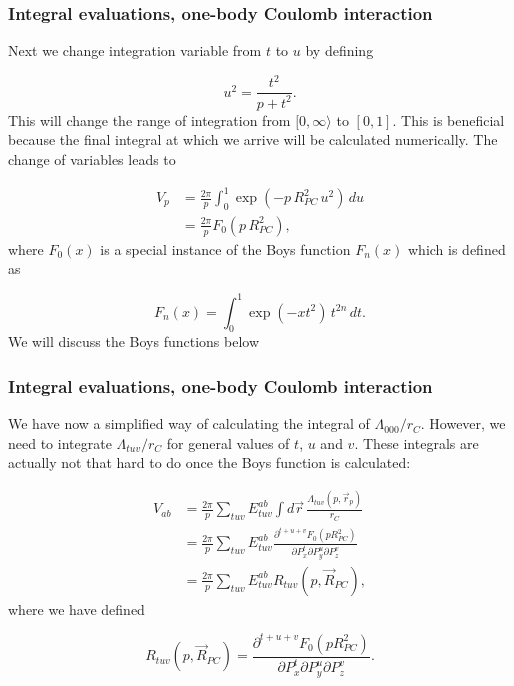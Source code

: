 \documentclass{beamer}
\begin{document}
\begin{frame}
\frametitle{Integral evaluations, one-body Coulomb interaction}

\begin{block}{}

Next we change integration variable from $t$ to $u$ by defining

\begin{equation}
 u^2 = \frac{t^2}{p + t^2}.
\end{equation}
This will change the range of integration from $[0,\infty\rangle$ to $[0,1]$. This is beneficial because the final integral at which we arrive will be calculated numerically.
The change of variables leads to

\begin{align}
\label{eq:V_p}
 V_p & = \frac{2\pi}{p}\int_0^1\exp(-p\,R^2_{PC}\,u^2)\,du \\
     & = \frac{2\pi}{p}F_0(p\,R^2_{PC}),
\end{align}
where $F_0(x)$ is a special instance of the Boys function $F_n(x)$ which is defined as

\begin{equation}
 F_n(x) = \int_0^1\exp(-xt^2)\,t^{2n}\,dt.
\end{equation}
We will discuss the Boys functions below
\end{block}
\end{frame}

\begin{frame}
\frametitle{Integral evaluations, one-body Coulomb interaction}

\begin{block}{}

We have now a  simplified way of calculating the integral of $\Lambda_{000}/r_C$. However, we need to integrate $\Lambda_{tuv}/r_C$ for general values of $t$, $u$ and $v$.
These integrals are actually not that hard to do once the Boys function is calculated:

\begin{align}
 V_{ab} & = \frac{2\pi}{p}\sum_{tuv}E^{ab}_{tuv}\int d\vec r \, \frac{\Lambda_{tuv}(p,\vec r_p)}{r_C} \\
        & = \frac{2\pi}{p}\sum_{tuv}E^{ab}_{tuv} \frac{\partial^{t+u+v} F_0(p R^2_{PC})}{\partial P_x^t \partial P_y^u \partial P_z^v} \\
        & = \frac{2\pi}{p}\sum_{tuv}E^{ab}_{tuv} R_{tuv}(p,\vec R_{PC}), \label{eq:V_ab}
\end{align}
where we have defined

\begin{equation}
 R_{tuv}(p,\vec R_{PC}) = \frac{\partial^{t+u+v} F_0(p R^2_{PC})}{\partial P_x^t \partial P_y^u \partial P_z^v}.
\end{equation}
\end{block}
\end{frame}
\end{document}
